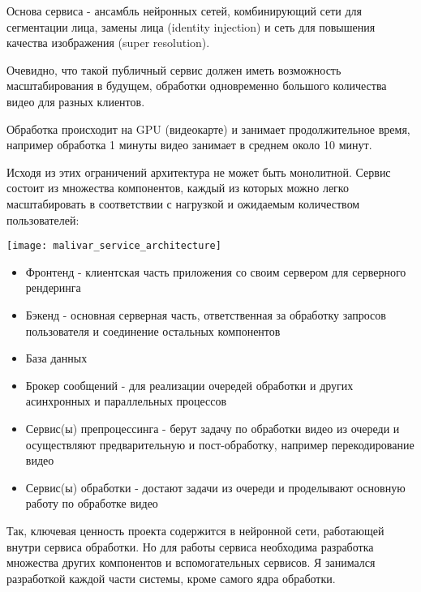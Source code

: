 Основа сервиса - ансамбль нейронных сетей, комбинирующий сети для сегментации лица, замены лица (identity injection) и сеть для повышения качества изображения (super resolution).

Очевидно, что такой публичный сервис должен иметь возможность масштабирования в будущем, обработки одновременно большого количества видео для разных клиентов.

Обработка происходит на GPU (видеокарте) и занимает продолжительное время, например обработка 1 минуты видео занимает в среднем около 10 минут.

Исходя из этих ограничений архитектура не может быть монолитной. Сервис состоит из множества компонентов, каждый из которых можно легко масштабировать в соответствии с нагрузкой и ожидаемым количеством пользователей:

\texttt{[image: malivar\_service\_architecture]}

\begin{itemize}
	\item Фронтенд - клиентская часть приложения со своим сервером для серверного рендеринга
	\item Бэкенд - основная серверная часть, ответственная за обработку запросов пользователя и соединение остальных компонентов
	\item База данных
	\item Брокер сообщений - для реализации очередей обработки и других асинхронных и параллельных процессов
	\item Сервис(ы) препроцессинга - берут задачу по обработки видео из очереди и осуществляют предварительную и пост-обработку, например перекодирование видео
	\item Сервис(ы) обработки - достают задачи из очереди и проделывают основную работу по обработке видео
\end{itemize}

Так, ключевая ценность проекта содержится в нейронной сети, работающей внутри сервиса обработки. Но для работы сервиса необходима разработка множества других компонентов и вспомогательных сервисов. Я занимался разработкой каждой части системы, кроме самого ядра обработки.




